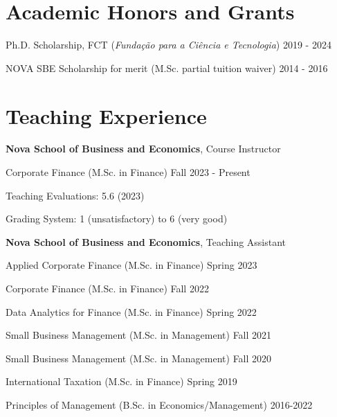\documentclass[letterpaper]{article}
\newenvironment{itemize*}{
  \begin{list}{}{
    \setlength{\leftmargin}{1.5em}
  }
}{
  \end{list}
}
\begin{document}
\section*{Academic Honors and Grants}
\vspace{-0.2in}
\hrulefill

\begin{itemize*}
\item Ph.D. Scholarship, FCT (\textit{Fundação para a Ciência e Tecnologia}) \hfill 2019 - 2024
\item NOVA SBE Scholarship for merit (M.Sc. partial tuition waiver) \hfill 2014 - 2016
\end{itemize*}

\section*{Teaching Experience}
\vspace{-0.2in}
\hrulefill
\begin{itemize*} 
\item \textbf{Nova School of Business and Economics}, Course Instructor
\begin{itemize*}
\item Corporate Finance (M.Sc. in Finance) \hfill Fall 2023 - Present
\begin{itemize*}
\item Teaching Evaluations: 5.6 (2023) 
\item Grading System: 1 (unsatisfactory) to 6 (very good)
\end{itemize*}
\end{itemize*}
\item \textbf{Nova School of Business and Economics}, Teaching Assistant
\begin{itemize*}
\item Applied Corporate Finance (M.Sc. in Finance) \hfill Spring 2023
\item Corporate Finance (M.Sc. in Finance) \hfill Fall 2022
\item Data Analytics for Finance (M.Sc. in Finance) \hfill Spring 2022
\item Small Business Management (M.Sc. in Management)  \hfill Fall 2021
\item Small Business Management (M.Sc. in Management)  \hfill Fall 2020
\item International Taxation (M.Sc. in Finance) \hfill Spring 2019
\item Principles of Management (B.Sc. in Economics/Management) \hfill 2016-2022
\end{itemize*}
\end{itemize*}
\end{document}
